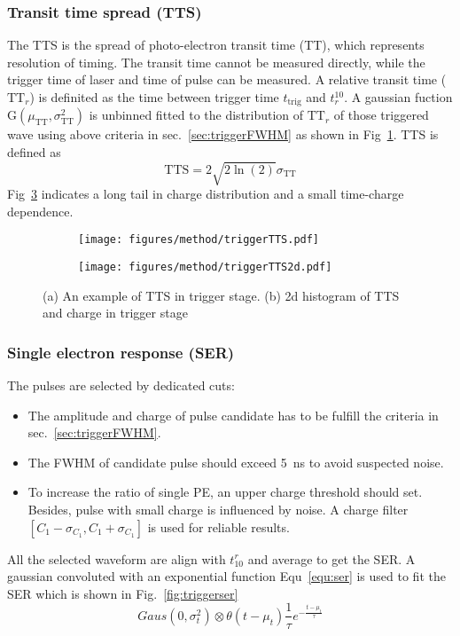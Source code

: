 \subsubsection{Transit time spread (TTS)}
The TTS is the spread of photo-electron transit time (TT), which represents resolution of timing. The transit time cannot be measured directly, while the trigger time of laser and time of pulse can be measured. A relative transit time ($\mathrm{TT}_r$) is definited as the time between trigger time $t_{\mathrm{trig}}$ and $t_r^{10}$. A gaussian fuction G$(\mu_{\mathrm{TT}},\sigma_{\mathrm{TT}}^2)$ is unbinned fitted to the distribution of $\mathrm{TT}_r$ of those triggered wave using above criteria in sec.~\ref{sec:triggerFWHM} as shown in Fig~\ref{fig:triggerTTS}. TTS is defined as
\begin{equation}
    \mathrm{TTS}=2\sqrt{2\ln(2)}\sigma_{\mathrm{TT}}
\end{equation}
Fig~\ref{fig:triggerTTS2d} indicates a long tail in charge distribution and a small time-charge dependence.
\begin{figure}[!htbp]
    \centering
    \begin{subfigure}[t]{0.47\textwidth}
        \texttt{[image: figures/method/triggerTTS.pdf]}
        \caption{}
        \label{fig:triggerTTS}
    \end{subfigure}
    \begin{subfigure}[t]{0.47\textwidth}
        \texttt{[image: figures/method/triggerTTS2d.pdf]}
        \caption{}
        \label{fig:triggerTTS2d}
    \end{subfigure}
    \caption{(a) An example of TTS in trigger stage. (b) 2d histogram of TTS and charge in trigger stage}
\end{figure}

\subsubsection{Single electron response (SER)}
The pulses are selected by dedicated cuts:
\begin{itemize}
    \item[1] The amplitude and charge of pulse candidate has to be fulfill the criteria in sec.~\ref{sec:triggerFWHM}.
    \item[2] The FWHM of candidate pulse should exceed \SI{5}{ns} to avoid suspected noise.
    \item[3] To increase the ratio of single PE, an upper charge threshold should set. Besides, pulse with small charge is influenced by noise. A charge filter $[C_1-\sigma_{C_1},C_1+\sigma_{C_1}]$ is used for reliable results.
\end{itemize}
All the selected waveform are align with $t_{10}^r$ and average to get the SER. A gaussian convoluted with an exponential function Equ~\eqref{equ:ser} is used to fit the SER which is shown in Fig.~\ref{fig:triggerser}
\begin{equation}
    \label{equ:ser}
    Gaus(0,\sigma_t^2)\otimes\theta(t-\mu_t)\frac{1}{\tau}e^{-\frac{t-\mu_t}{\tau}}
\end{equation}

